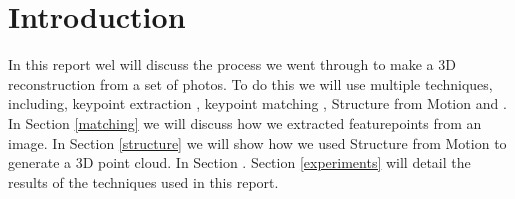 \section{Introduction}
\label{intro}
In this report wel will discuss the process we went through to make a 3D reconstruction from a set of photos. To do this we will use multiple techniques, including, keypoint extraction \cite{SIFT}, keypoint matching \cite{FLANN_based_matcher}, Structure from Motion \cite{SfM} and .
In Section \ref{matching} we will discuss how we extracted featurepoints from an image. In Section \ref{structure} we will show how we used Structure from Motion to generate a 3D point cloud. In Section . Section \ref{experiments} will detail the results of the techniques used in this report.
